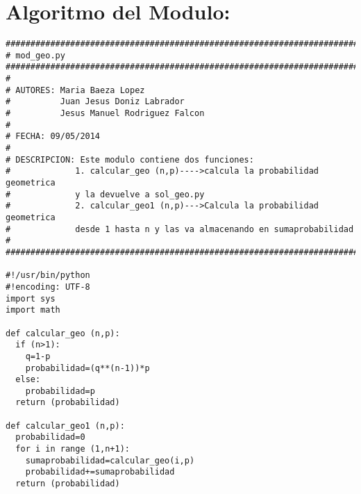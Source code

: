\newpage
\section{Algoritmo del Modulo:}
\label{Apendice1:YYY}

\begin{center}
\begin{footnotesize}
\begin{verbatim}
###################################################################################
# mod_geo.py
###################################################################################
#
# AUTORES: Maria Baeza Lopez
#          Juan Jesus Doniz Labrador
#          Jesus Manuel Rodriguez Falcon
#
# FECHA: 09/05/2014
#
# DESCRIPCION: Este modulo contiene dos funciones:
#             1. calcular_geo (n,p)---->calcula la probabilidad geometrica
#			  y la devuelve a sol_geo.py
#             2. calcular_geo1 (n,p)--->Calcula la probabilidad geometrica
#             desde 1 hasta n y las va almacenando en sumaprobabilidad
#
###################################################################################

#!/usr/bin/python
#!encoding: UTF-8
import sys
import math

def calcular_geo (n,p):
  if (n>1):
    q=1-p
    probabilidad=(q**(n-1))*p
  else:
    probabilidad=p
  return (probabilidad)

def calcular_geo1 (n,p):
  probabilidad=0
  for i in range (1,n+1):
    sumaprobabilidad=calcular_geo(i,p)
    probabilidad+=sumaprobabilidad
  return (probabilidad)
\end{verbatim}
\end{footnotesize}
\end{center}
